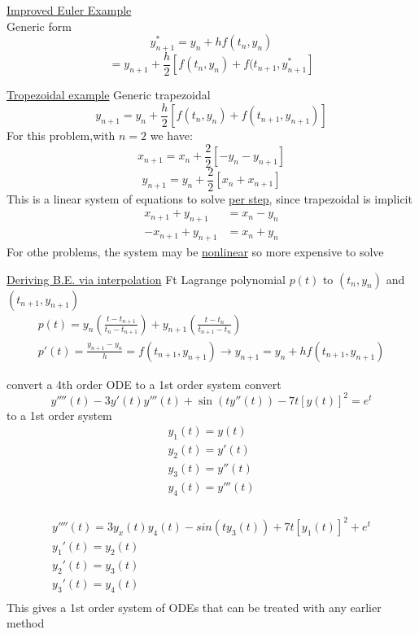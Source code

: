 \documentclass[10pt,usletter]{article}
\begin{document}
\underline{Improved Euler Example}\\
Generic form $$y_{n+1}^*=y_n+hf(t_n,y_n)$$
$$=y_{n+1}+\frac{h}{2}[f(t_n,y_n)+f(t_{n+1},y_{n+1}^*]$$

\underline{Tropezoidal example}
Generic trapezoidal $$y_{n+1}=y_n+\frac{h}{2}[f(t_n,y_n)+f(t_{n+1},y_{n+1})]$$
For this problem,with $n=2$ we have:
$$x_{n+1}=x_n+\frac{2}{2}[-y_n-y_{n+1}]$$
$$y_{n+1}=y_n+\frac{2}{2}[x_n+x_{n+1}]$$
This is a linear system of equations to solve \underline{per step}, since trapezoidal is implicit
\begin{align*}
x_{n+1}+y_{n+1}&=x_n-y_n\\
-x_{n+1}+y_{n+1}&=x_n+y_n
\end{align*}
For othe problems, the system may be \underline{nonlinear} so more expensive to solve



\underline{Deriving B.E. via interpolation}
Ft Lagrange polynomial $p(t)$ to $(t_n,y_n)$ and $(t_{n+1},y_{n+1})$
\begin{align*}
p(t)=y_n(\frac{t - t_{n+1}}{t_n-t_{n+1}})+y_{n+1}(\frac{t-t_n}{t_{n+1}-t_n})\\
p'(t)=\frac{y_{n+1}-y_n}{h}=f(t_{n+1},y_{n+1})\rightarrow y_{n+1}=y_n+hf(t_{n+1},y_{n+1})
\end{align*}

convert a 4th order ODE to a 1st order system
convert
$$y''''(t)-3y'(t)y'''(t)+\sin(ty''(t))-7t[y(t)]^2=e^t$$
to a 1st order system\\
\begin{align*}
y_1(t)=y(t)\\
y_2(t)=y'(t)\\
y_3(t)=y''(t)\\
y_4(t)=y'''(t)\\
\end{align*}


\begin{align*}
y''''(t)=3y_x(t)y_4(t)-sin(ty_3(t))+7t[y_1(t)]^2+e^t\\
y_1'(t)=y_2(t)\\
y_2'(t)=y_3(t)\\
y_3'(t)=y_4(t)\\
\end{align*}
This gives a 1st order system of ODEs that can be treated with any earlier method
\end{document}
